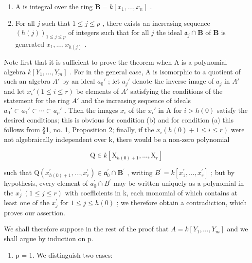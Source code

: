 \begin{enumerate}
\def\labelenumi{(\alph{enumi})}
\item
  A is integral over the ring \(\mathbf{B} = k[x_1, \ldots, x_n]\) .
\item
  For all \(j\) such that \(1 \leqslant j \leqslant p\) , there exists an increasing sequence \((h(j))_{1 \leqslant j \leqslant p}\) of integers such that for all \(j\) the ideal \(\mathfrak{a}_j \cap \mathbf{B}\) of \(\mathbf{B}\) is generated \(x_1, \ldots, x_{h(j)}\) .
\end{enumerate}

Note first that it is sufficient to prove the theorem when A is a polynomial algebra \(k[Y_{1},\ldots,Y_{m}]\) . For in the general case, A is isomorphic to a quotient of such an algebra \(A'\) by an ideal \(a_{0}'\) ; let \(a_{j}'\) denote the inverse image of \(a_{j}\) in \(A'\) and let \(x_{i}'(1\leqslant i\leqslant r)\) be elements of \(A'\) satisfying the conditions of the statement for the ring \(A'\) and the increasing sequence of ideals \(a_{0}'\subset a_{1}'\subset\cdots\subset a_{p}'\) . Then the images \(x_{i}\) of the \(x_{i}'\) in A for \(i>h(0)\) satisfy the desired conditions; this is obvious for condition (b) and for condition (a) this follows from §1, no. 1, Proposition 2; finally, if the \(x_{i}(h(0)+1\leqslant i\leqslant r)\) were not algebraically independent over k, there would be a non-zero polynomial

\[
\mathrm{Q} \in k [ \mathrm{X} _ {h (0) + 1}, \dots , \mathrm{X} _ {r} ]
\]

such that \(\mathrm{Q}(x_{h(0)+1}^{\prime},\ldots,x_{r}^{\prime})\in\mathfrak{a}_{0}^{\prime}\cap\mathbf{B}^{\prime}\) , writing \(B^{\prime}=k[x_{1}^{\prime},\ldots,x_{r}^{\prime}]\) ; but by hypothesis, every element of \(a_{0}^{\prime}\cap B^{\prime}\) may be written uniquely as a polynomial in the \(x_{j}^{\prime}\ (1\leqslant j\leqslant r)\) with coefficients in k, each monomial of which contains at least one of the \(x_{j}^{\prime}\) for \(1\leqslant j\leqslant h(0)\) ; we therefore obtain a contradiction, which proves our assertion.

We shall therefore suppose in the rest of the proof that \(A = k[Y_{1}, \ldots, Y_{m}]\) and we shall argue by induction on p.

\begin{enumerate}
\def\labelenumi{(\Alph{enumi})}
\tightlist
\item
  p = 1. We distinguish two cases:
\end{enumerate}

